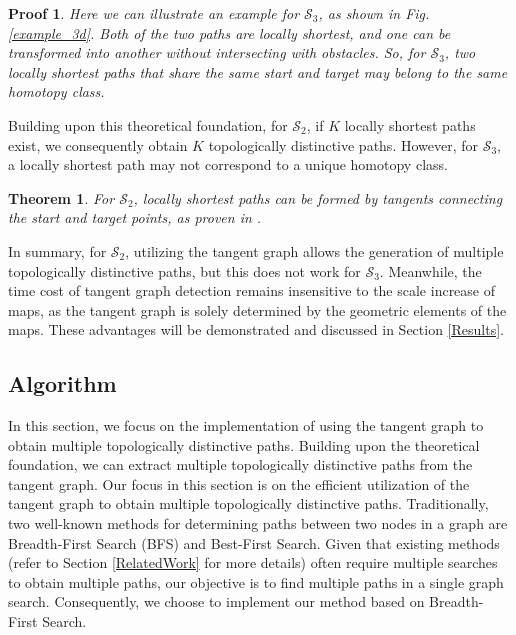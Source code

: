 \documentclass[letterpaper, 10 pt, journal, twoside]{IEEEtran}
\newtheorem{myTheo}{Theorem}
\newtheorem{myProof}{Proof}
\begin{document}
\begin{myProof}
Here we can illustrate an example for $\mathcal{S}_{3}$, as shown in Fig. \ref{example_3d}. Both of the two paths are locally shortest, and one can be transformed into another without intersecting with obstacles. So, for $\mathcal{S}_{3}$, two locally shortest paths that share the same start and target may belong to the same homotopy class.

\end{myProof}

Building upon this theoretical foundation, for $\mathcal{S}_{2}$, if $K$ locally shortest paths exist, we consequently obtain $K$ topologically distinctive paths. However, for $\mathcal{S}_{3}$, a locally shortest path may not correspond to a unique homotopy class.

\begin{myTheo}
For $\mathcal{S}_{2}$, locally shortest paths can be formed by tangents connecting the start and target points, as proven in \cite{liu1991proposal, yao2019reinforcedrimjump}.
\end{myTheo}

In summary, for $\mathcal{S}_{2}$, utilizing the tangent graph allows the generation of multiple topologically distinctive paths, but this does not work for $\mathcal{S}_{3}$. Meanwhile, the time cost of tangent graph detection remains insensitive to the scale increase of maps, as the tangent graph is solely determined by the geometric elements of the maps. These advantages will be demonstrated and discussed in Section \ref{Results}.


\subsection{Algorithm}

In this section, we focus on the implementation of using the tangent graph to obtain multiple topologically distinctive paths. Building upon the theoretical foundation, we can extract multiple topologically distinctive paths from the tangent graph. Our focus in this section is on the efficient utilization of the tangent graph to obtain multiple topologically distinctive paths. Traditionally, two well-known methods for determining paths between two nodes in a graph are Breadth-First Search (BFS) and Best-First Search. Given that existing methods (refer to Section \ref{RelatedWork} for more details) often require multiple searches to obtain multiple paths, our objective is to find multiple paths in a single graph search. Consequently, we choose to implement our method based on Breadth-First Search.
\end{document}
